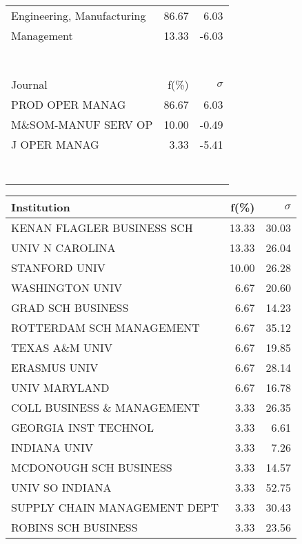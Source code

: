 \documentclass[a4paper,11pt]{report}
\begin{document}
\begin{landscape}
\begin{table}[!ht]
{\begin{tabular}{|l r r|}
Engineering, Manufacturing & 86.67 & 6.03\\
Management & 13.33 & -6.03\\
 &  & \\
 &  & \\
 &  & \\
 &  & \\
 &  & \\
 &  & \\
 &  & \\
\hline
\hline
Journal & f(\%) & $\sigma$\\
\hline
PROD OPER MANAG & 86.67 & 6.03\\
M\&SOM-MANUF SERV OP & 10.00 & -0.49\\
J OPER MANAG & 3.33 & -5.41\\
 &  & \\
 &  & \\
 &  & \\
 &  & \\
 &  & \\
 &  & \\
 &  & \\
\hline
\end{tabular}
}
{\scriptsize\begin{tabular}{|l r r|}
\hline
Institution & f(\%) & $\sigma$\\
\hline
KENAN FLAGLER BUSINESS SCH & 13.33 & 30.03\\
UNIV N CAROLINA & 13.33 & 26.04\\
STANFORD UNIV & 10.00 & 26.28\\
WASHINGTON UNIV & 6.67 & 20.60\\
GRAD SCH BUSINESS & 6.67 & 14.23\\
ROTTERDAM SCH MANAGEMENT & 6.67 & 35.12\\
TEXAS A\&M UNIV & 6.67 & 19.85\\
ERASMUS UNIV & 6.67 & 28.14\\
UNIV MARYLAND & 6.67 & 16.78\\
COLL BUSINESS \& MANAGEMENT & 3.33 & 26.35\\
GEORGIA INST TECHNOL & 3.33 & 6.61\\
INDIANA UNIV & 3.33 & 7.26\\
MCDONOUGH SCH BUSINESS & 3.33 & 14.57\\
UNIV SO INDIANA & 3.33 & 52.75\\
SUPPLY CHAIN MANAGEMENT DEPT & 3.33 & 30.43\\
ROBINS SCH BUSINESS & 3.33 & 23.56\\

\end{tabular}}
\end{table}
\end{landscape}
\end{document}

